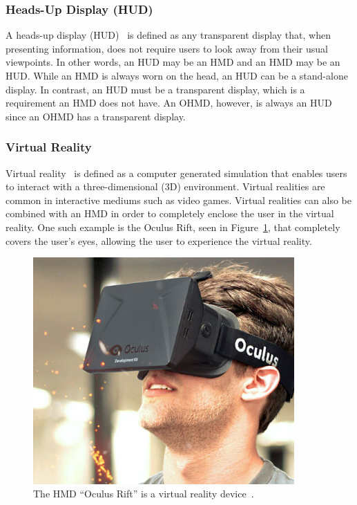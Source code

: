 \subsubsection{Heads-Up Display (HUD)}
\label{subsubsec:hud}
A heads-up display (HUD)~\cite{hudWiki} is defined as any transparent display that, when presenting information, does not require users to look away from their usual viewpoints. In other words, an HUD may be an HMD and an HMD may be an HUD. While an HMD is always worn on the head, an HUD can be a stand-alone display. In contrast, an HUD must be a transparent display, which is a requirement an HMD does not have. An OHMD, however, is always an HUD since an OHMD has a transparent display.

\subsubsection{Virtual Reality}
\label{subsubsec:vr}
Virtual reality~\cite{virtualRealityDef} is defined as a computer generated simulation that enables users to interact with a three-dimensional (3D) environment. Virtual realities are common in interactive mediums such as video games. Virtual realities can also be combined with an HMD in order to completely enclose the user in the virtual reality. One such example is the Oculus Rift, seen in Figure~\ref{OculusRift}, that completely covers the user's eyes, allowing the user to experience the virtual reality.

	\begin{figure}[ht!]
		\centering
		\includegraphics[width=100mm]{images/OculusRift}
		\caption{The HMD ``Oculus Rift'' is a virtual reality device~\cite{ImagesOculusRift}.}
		\label{OculusRift}
	\end{figure}

